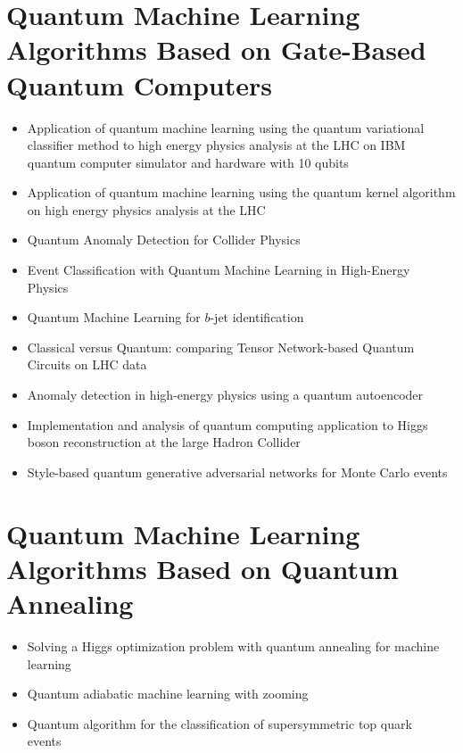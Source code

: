 \section{Quantum Machine Learning Algorithms Based on Gate-Based Quantum Computers}

\begin{itemize}
   \item Application of quantum machine learning using the quantum variational classifier method to high energy physics analysis at the LHC on IBM quantum computer simulator and hardware with 10 qubits~\cite{Wu:2020cye}
   \item Application of quantum machine learning using the quantum kernel algorithm on high energy physics analysis at the LHC~\cite{Wu:2021xsj}
   \item Quantum Anomaly Detection for Collider Physics~\cite{Alvi:2022fkk}
   \item Event Classification with Quantum Machine Learning in High-Energy Physics~\cite{Terashi:2020wfi}
   \item Quantum Machine Learning for $b$-jet identification~\cite{Gianelle:2022unu}
   \item Classical versus Quantum: comparing Tensor Network-based Quantum Circuits on LHC data~\cite{Araz:2022haf}
   \item Anomaly detection in high-energy physics using a quantum autoencoder~\cite{Ngairangbam:2021yma}
   \item Implementation and analysis of quantum computing application to Higgs boson reconstruction at the large Hadron Collider~\cite{AlexiadesArmenakas:2021lrs}
   \item Style-based quantum generative adversarial networks for Monte Carlo events~\cite{Bravo-Prieto:2021ehz}
\end{itemize}


\section{Quantum Machine Learning Algorithms Based on Quantum Annealing}

\begin{itemize}
   \item Solving a Higgs optimization problem with quantum annealing for machine learning~\cite{Mott:2017xdb}
   \item Quantum adiabatic machine learning with zooming~\cite{Zlokapa:2019lvv}
   \item Quantum algorithm for the classification of supersymmetric top quark events~\cite{Bargassa:2021jmk}
\end{itemize}


